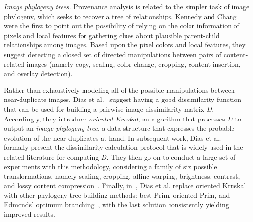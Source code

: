 
\textit{Image phylogeny trees.}
Provenance analysis is related to the simpler task of image phylogeny, which seeks to recover a tree of relationships.
Kennedy and Chang~\cite{Kennedy_2008} were the first to point out the possibility of relying on the color information of pixels and local features for gathering clues about plausible parent-child relationships among images.
Based upon the pixel colors and local features, they suggest detecting a closed set of directed manipulations between pairs of content-related images (namely copy, scaling, color change, cropping, content insertion, and overlay detection).

Rather than exhaustively modeling all of the possible manipulations between near-duplicate images, Dias et al.~\cite{Dias_2011} suggest having a good dissimilarity function that can be used for building a pairwise image dissimilarity matrix $D$.
Accordingly, they introduce \emph{oriented Kruskal}, an algorithm that processes $D$ to output an \emph{image phylogeny tree}, a data structure that expresses the probable evolution of the near duplicates at hand.
In subsequent work, Dias et al.~\cite{Dias_2012} formally present the dissimilarity-calculation protocol that is widely used in the related literature for computing $D$.
They then go on to conduct a large set of experiments with this methodology, considering a family of six possible transformations, namely scaling, cropping, affine warping, brightness, contrast, and lossy content compression~\cite{Dias_2013_large}.
Finally, in~\cite{Dias_2013}, Dias et al. replace oriented Kruskal with other phylogeny tree building methods: best Prim, oriented Prim, and %
Edmonds' optimum branching~\cite{edmonds_1967}, with the last solution consistently yielding improved results.

